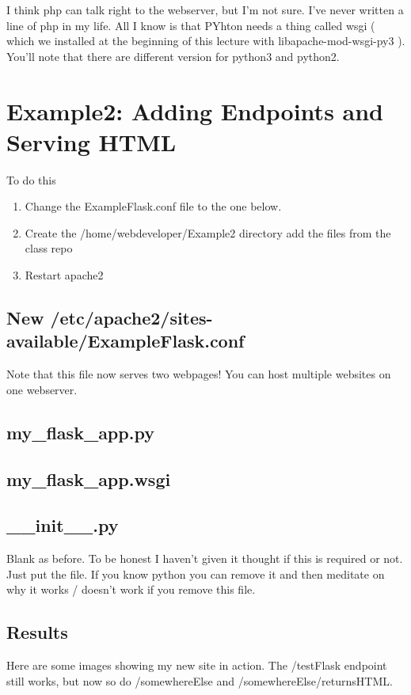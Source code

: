 \documentclass[10pt]{article}
\begin{document}
I think php can talk right to the webserver, but I'm not sure. I've never written a line of php in my life. All I know is that PYhton needs a thing called wsgi ( which we installed at the beginning of this lecture with libapache-mod-wsgi-py3 ). You'll note that there are different version for python3 and python2.

\section{Example2: Adding Endpoints and Serving HTML}
To do this
\begin{enumerate}
\item Change the ExampleFlask.conf file to the one below.
\item Create the /home/webdeveloper/Example2 directory add the files from the class repo
\item Restart apache2
\end{enumerate}

\subsection{New /etc/apache2/sites-available/ExampleFlask.conf}
Note that this file now serves two webpages! You can host multiple websites on one webserver.


\subsection{my\_flask\_app.py}


\subsection{my\_flask\_app.wsgi}


\subsection{\_\_init\_\_.py}
Blank as before. To be honest I haven't given it thought if this is required or not. Just put the file. If you know python you can remove it and then meditate on why it works / doesn't work if you remove this file.

\subsection{ Results }
Here are some images showing my new site in action. The /testFlask endpoint still works, but now so do /somewhereElse and /somewhereElse/returnsHTML.
\end{document}

